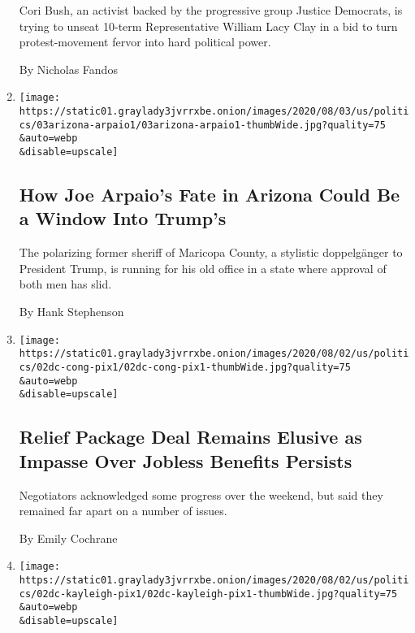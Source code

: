 \begin{enumerate}
  Cori Bush, an activist backed by the progressive group Justice
  Democrats, is trying to unseat 10-term Representative William Lacy
  Clay in a bid to turn protest-movement fervor into hard political
  power.

  By Nicholas Fandos
\item
  \href{/2020/08/02/us/politics/arizona-election-joe-arpaio.html}{}

  \texttt{[image: https://static01.graylady3jvrrxbe.onion/images/2020/08/03/us/politics/03arizona-arpaio1/03arizona-arpaio1-thumbWide.jpg?quality=75\\\&auto=webp\\\&disable=upscale]}

  \hypertarget{how-joe-arpaios-fate-in-arizona-could-be-a-window-into-trumps-1}{%
  \subsection{How Joe Arpaio's Fate in Arizona Could Be a Window Into
  Trump's}\label{how-joe-arpaios-fate-in-arizona-could-be-a-window-into-trumps-1}}

  The polarizing former sheriff of Maricopa County, a stylistic
  doppelgänger to President Trump, is running for his old office in a
  state where approval of both men has slid.

  By Hank Stephenson
\item
  \href{/2020/08/02/us/politics/coronavirus-jobless-aid.html}{}

  \texttt{[image: https://static01.graylady3jvrrxbe.onion/images/2020/08/02/us/politics/02dc-cong-pix1/02dc-cong-pix1-thumbWide.jpg?quality=75\\\&auto=webp\\\&disable=upscale]}

  \hypertarget{relief-package-deal-remains-elusive-as-impasse-over-jobless-benefits-persists}{%
  \subsection{Relief Package Deal Remains Elusive as Impasse Over
  Jobless Benefits
  Persists}\label{relief-package-deal-remains-elusive-as-impasse-over-jobless-benefits-persists}}

  Negotiators acknowledged some progress over the weekend, but said they
  remained far apart on a number of issues.

  By Emily Cochrane
\item
  \href{/2020/08/02/us/politics/kayleigh-mcenany.html}{}

  \texttt{[image: https://static01.graylady3jvrrxbe.onion/images/2020/08/02/us/politics/02dc-kayleigh-pix1/02dc-kayleigh-pix1-thumbWide.jpg?quality=75\\\&auto=webp\\\&disable=upscale]}


\end{enumerate}
